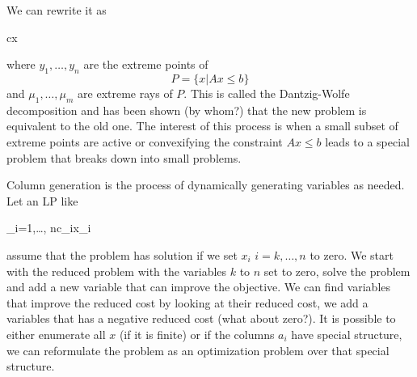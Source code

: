 \documentclass{article}
\begin{document}
	We can rewrite it as 
	
	\begin{mini!}
		{}{c\cdot x}{}{}
	\end{mini!}
	where $y_1,\ldots,y_n$ are the extreme points of 
	\begin{equation}
		P = \{x | Ax \leq b\}
	\end{equation}
	and $\mu_1,\ldots,\mu_m$ are extreme rays of $P$. This is called the Dantzig-Wolfe decomposition \parencite{dantzigDecompositionPrincipleLinear1960} and has been shown (by whom?) that the new problem is equivalent to the old one. The interest of this process is when a small subset of extreme points are active or convexifying the constraint $Ax \leq b$ leads to a special problem that breaks down into small problems.
	
	
	
	Column generation is the process of dynamically generating variables as needed. Let an LP like 
	\begin{mini!}
		{}{\sum_{i=1,\ldots, n}c_ix_i}{}{}
		\addConstraint{\sum_{i=1,\ldots, n} a^j_ix_i}{\leq b^j}{\quad j \in 1,\ldots,m,}
	\end{mini!}
 	assume that the problem has solution if we set $x_i$ $i=k,\ldots,n$ to zero. We start with the reduced problem with the variables $k$ to $n$ set to zero, solve the problem and add a new variable that can improve the objective. We can find variables that improve the reduced cost by looking at their reduced cost, we add a variables that has a negative reduced cost (what about zero?). It is possible to either enumerate all $x$ (if it is finite) or if the columns $a_i$ have special structure, we can reformulate the problem as an optimization problem over that special structure.
 	
\end{document}
